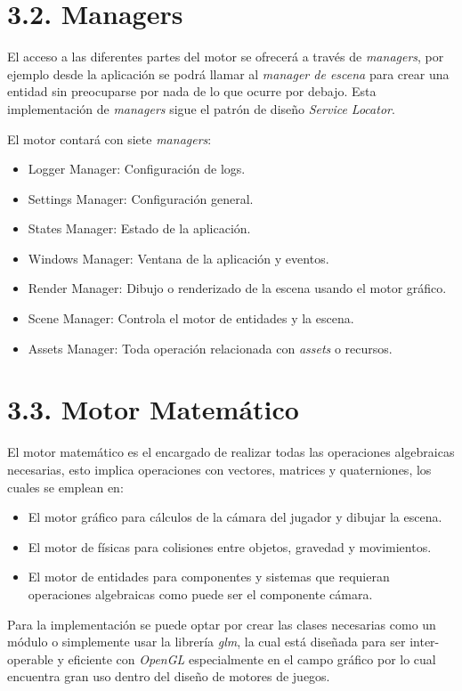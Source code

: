 \newpage


\section*{3.2. Managers}\label{sec:managers}

El acceso a las diferentes partes del motor se ofrecerá a través de \textit{managers}, por ejemplo desde
la aplicación se podrá llamar al \textit{manager de escena} para crear una entidad sin preocuparse por nada
de lo que ocurre por debajo. Esta implementación de \textit{managers} sigue el patrón de diseño \textit{Service Locator}\cite{service-locator-pattern}.

El motor contará con siete \textit{managers}:
\begin{itemize}
    \item Logger Manager: Configuración de logs.
    \item Settings Manager: Configuración general.
    \item States Manager: Estado de la aplicación.
    \item Windows Manager: Ventana de la aplicación y eventos.
    \item Render Manager: Dibujo o renderizado de la escena usando el motor gráfico.
    \item Scene Manager: Controla el motor de entidades y la escena.
    \item Assets Manager: Toda operación relacionada con \textit{assets} o recursos.
\end{itemize}

\section*{3.3. Motor Matemático}\label{sec:math_engine}

El motor matemático es el encargado de realizar todas las operaciones algebraicas necesarias, esto implica operaciones con
vectores, matrices y quaterniones, los cuales se emplean en:
\begin{itemize}
    \item El motor gráfico para cálculos de la cámara del jugador y dibujar la escena.
    \item El motor de físicas para colisiones entre objetos, gravedad y movimientos.
    \item El motor de entidades para componentes y sistemas que requieran operaciones algebraicas como puede ser el componente cámara.
\end{itemize}
Para la implementación se puede optar por crear las clases necesarias como un módulo o simplemente usar la librería
\textit{glm}\cite{glm}, la cual está diseñada para ser inter-operable y eficiente con \textit{OpenGL}\cite{opengl} especialmente en el campo gráfico por lo cual
encuentra gran uso dentro del diseño de motores de juegos.

